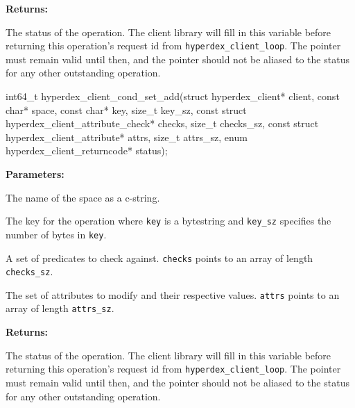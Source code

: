 \noindent\textbf{Returns:}
\begin{description}[labelindent=\widthof{{\texttt{status}}},leftmargin=*,noitemsep,nolistsep,align=right]
\item[\texttt{status}] The status of the operation.  The client library will fill in this variable before returning this operation's request id from \texttt{hyperdex\_client\_loop}.  The pointer must remain valid until then, and the pointer should not be aliased to the status for any other outstanding operation.
\end{description}

\funcsep
\begin{ccode}
int64_t hyperdex_client_cond_set_add(struct hyperdex_client* client,
                const char* space,
                const char* key, size_t key_sz,
                const struct hyperdex_client_attribute_check* checks, size_t checks_sz,
                const struct hyperdex_client_attribute* attrs, size_t attrs_sz,
                enum hyperdex_client_returncode* status);
\end{ccode}
\funcdesc 

\noindent\textbf{Parameters:}
\begin{description}[labelindent=\widthof{{\texttt{checks}, \texttt{checks\_sz}}},leftmargin=*,noitemsep,nolistsep,align=right]
\item[\texttt{space}] The name of the space as a c-string.
\item[\texttt{key}, \texttt{key\_sz}] The key for the operation where \texttt{key} is a bytestring and \texttt{key\_sz} specifies the number of bytes in \texttt{key}.
\item[\texttt{checks}, \texttt{checks\_sz}] A set of predicates to check against.  \texttt{checks} points to an array of length \texttt{checks\_sz}.
\item[\texttt{attrs}, \texttt{attrs\_sz}] The set of attributes to modify and their respective values.  \texttt{attrs} points to an array of length \texttt{attrs\_sz}.
\end{description}

\noindent\textbf{Returns:}
\begin{description}[labelindent=\widthof{{\texttt{status}}},leftmargin=*,noitemsep,nolistsep,align=right]
\item[\texttt{status}] The status of the operation.  The client library will fill in this variable before returning this operation's request id from \texttt{hyperdex\_client\_loop}.  The pointer must remain valid until then, and the pointer should not be aliased to the status for any other outstanding operation.
\end{description}

